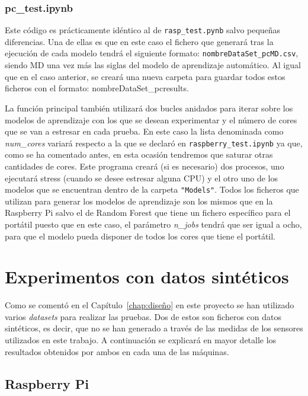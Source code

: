 \documentclass[a4paper, 12pt]{book}
\begin{document}
\subsubsection{pc\_test.ipynb}
\label{subsubsec:programa_pruebas_pc}

Este código es prácticamente idéntico al de \texttt{rasp\_test.pynb} salvo pequeñas diferencias. Una de ellas es que en este caso el fichero que generará tras la ejecución de cada modelo tendrá el siguiente formato: \texttt{nombreDataSet\_pcMD.csv}, siendo MD una vez más las siglas del modelo de aprendizaje automático. Al igual que en el caso anterior, se creará una nueva carpeta para guardar todos estos ficheros con el formato: nombreDataSet\_pcresults.

La función principal también utilizará dos bucles anidados para iterar sobre los modelos de aprendizaje con los que se desean experimentar y el número de cores que se van a estresar en cada prueba. En este caso la lista denominada como \textit{num\_cores} variará respecto a la que se declaró en \texttt{raspberry\_test.ipynb} ya que, como se ha comentado antes, en esta ocasión tendremos que saturar otras cantidades de cores. Este programa creará (si es necesario) dos procesos, uno ejecutará stress (cuando se desee estresar alguna CPU) y el otro uno de los modelos que se encuentran dentro de la carpeta \texttt{"Models"}. Todos los ficheros que utilizan para generar los modelos de aprendizaje son los mismos que en la Raspberry Pi salvo el de Random Forest que tiene un fichero específico para el portátil puesto que en este caso, el parámetro \textit{n\_jobs} tendrá que ser igual a ocho, para que el modelo pueda disponer de todos los cores que tiene el portátil. 


\section{Experimentos con datos sintéticos}
\label{sec:exp_dSinteticos}

Como se comentó en el Capítulo~\ref{chap:diseño} en este proyecto se han utilizado varios \textit{datasets} para realizar las pruebas. Dos de estos son ficheros con datos sintéticos, es decir, que no se han generado a través de las medidas de los sensores utilizados en este trabajo. A continuación se explicará en mayor detalle los resultados obtenidos por ambos en cada una de las máquinas.

\subsection{Raspberry Pi}
\label{sub:rasp_sinteticos}
\end{document}
